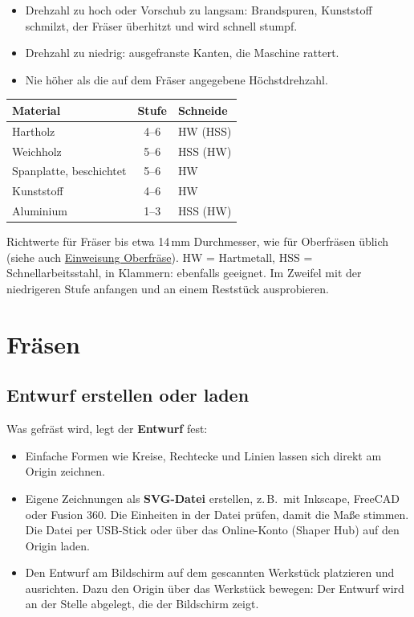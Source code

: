 \documentclass{\basedir/fablab-document}
\begin{document}
	\begin{itemize}
		\item Drehzahl zu hoch oder Vorschub zu langsam: Brandspuren, Kunststoff schmilzt, der Fräser überhitzt und wird schnell stumpf.
		\item Drehzahl zu niedrig: ausgefranste Kanten, die Maschine rattert.
		\item Nie höher als die auf dem Fräser angegebene Höchstdrehzahl.
	\end{itemize}

	\begin{center}
		\small
		\renewcommand{\arraystretch}{1.3}
		\begin{tabularx}{0.8\textwidth}{|X|c|l|}
			\hline
			\textbf{Material} & \textbf{Stufe} & \textbf{Schneide} \\ \hline
			Hartholz & 4--6 & HW (HSS) \\ \hline
			Weichholz & 5--6 & HSS (HW) \\ \hline
			Spanplatte, beschichtet & 5--6 & HW \\ \hline
			Kunststoff & 4--6 & HW \\ \hline
			Aluminium & 1--3 & HSS (HW) \\ \hline
		\end{tabularx}
	\end{center}

	{\footnotesize Richtwerte für Fräser bis etwa 14\,mm Durchmesser, wie für Oberfräsen üblich (siehe auch \href{https://github.com/fau-fablab/festool-oberfraese-einweisung}{Einweisung Oberfräse}). HW = Hartmetall, HSS = Schnellarbeitsstahl, in Klammern: ebenfalls geeignet. Im Zweifel mit der niedrigeren Stufe anfangen und an einem Reststück ausprobieren.}

	\section{Fräsen}

	\subsection{Entwurf erstellen oder laden}
	Was gefräst wird, legt der \textbf{Entwurf} fest:
	\begin{itemize}
		\item Einfache Formen wie Kreise, Rechtecke und Linien lassen sich direkt am Origin zeichnen.
		\item Eigene Zeichnungen als \textbf{SVG-Datei} erstellen, z.\,B.\ mit Inkscape, FreeCAD oder Fusion 360. Die Einheiten in der Datei prüfen, damit die Maße stimmen. Die Datei per USB-Stick oder über das Online-Konto (Shaper Hub) auf den Origin laden.
		\item Den Entwurf am Bildschirm auf dem gescannten Werkstück platzieren und ausrichten. Dazu den Origin über das Werkstück bewegen: Der Entwurf wird an der Stelle abgelegt, die der Bildschirm zeigt.
	\end{itemize}
\end{document}
